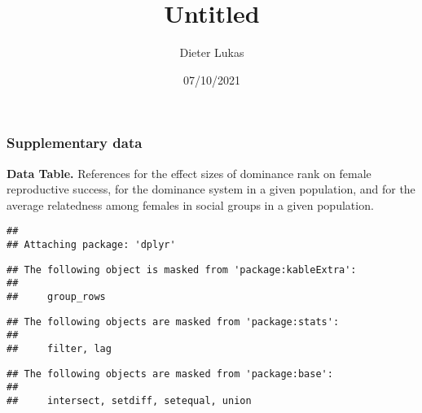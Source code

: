 \documentclass[
]{article}
\title{Untitled}
\author{Dieter Lukas}
\date{07/10/2021}
\begin{document}
\maketitle

\hypertarget{supplementary-data}{%
\subsubsection{Supplementary data}\label{supplementary-data}}

\textbf{Data Table.} References for the effect sizes of dominance rank
on female reproductive success, for the dominance system in a given
population, and for the average relatedness among females in social
groups in a given population.

\begin{verbatim}
## 
## Attaching package: 'dplyr'
\end{verbatim}

\begin{verbatim}
## The following object is masked from 'package:kableExtra':
## 
##     group_rows
\end{verbatim}

\begin{verbatim}
## The following objects are masked from 'package:stats':
## 
##     filter, lag
\end{verbatim}

\begin{verbatim}
## The following objects are masked from 'package:base':
## 
##     intersect, setdiff, setequal, union
\end{verbatim}
\end{document}
